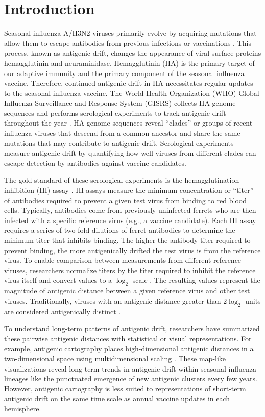 \documentclass[utf8]{FrontiersinHarvard} %
\begin{document}
\section{Introduction}

Seasonal influenza A/H3N2 viruses primarily evolve by acquiring mutations that allow them to escape antibodies from previous infections or vaccinations \citep{Petrova2018}.
This process, known as antigenic drift, changes the appearance of viral surface proteins hemagglutinin and neuraminidase.
Hemagglutinin (HA) is the primary target of our adaptive immunity and the primary component of the seasonal influenza vaccine.
Therefore, continued antigenic drift in HA necessitates regular updates to the seasonal influenza vaccine.
The World Health Organization (WHO) Global Influenza Surveillance and Response System (GISRS) collects HA genome sequences and performs serological experiments to track antigenic drift throughout the year \citep{Morris:2017ea}.
HA genome sequences reveal ``clades'' or groups of recent influenza viruses that descend from a common ancestor and share the same mutations that may contribute to antigenic drift.
Serological experiments measure antigenic drift by quantifying how well viruses from different clades can escape detection by antibodies against vaccine candidates.

The gold standard of these serological experiments is the hemagglutination inhibition (HI) assay \citep{hirst1943studies}.
HI assays measure the minimum concentration or ``titer'' of antibodies required to prevent a given test virus from binding to red blood cells.
Typically, antibodies come from previously uninfected ferrets who are then infected with a specific reference virus (e.g., a vaccine candidate).
Each HI assay requires a series of two-fold dilutions of ferret antibodies to determine the minimum titer that inhibits binding.
The higher the antibody titer required to prevent binding, the more antigenically drifted the test virus is from the reference virus.
To enable comparison between measurements from different reference viruses, researchers normalize titers by the titer required to inhibit the reference virus itself and convert values to a $\log_{2}$ scale \citep{Neher:2016hy}.
The resulting values represent the magnitude of antigenic distance between a given reference virus and other test viruses.
Traditionally, viruses with an antigenic distance greater than $2\log_{2}$ units are considered antigenically distinct \citep{Katz2011}.

To understand long-term patterns of antigenic drift, researchers have summarized these pairwise antigenic distances with statistical or visual representations.
For example, antigenic cartography places high-dimensional antigenic distances in a two-dimensional space using multidimensional scaling \citep{Smith:2004jc,Bedford:2014bf}.
These map-like visualizations reveal long-term trends in antigenic drift within seasonal influenza lineages like the punctuated emergence of new antigenic clusters every few years.
However, antigenic cartography is less suited to representations of short-term antigenic drift on the same time scale as annual vaccine updates in each hemisphere.
\end{document}
